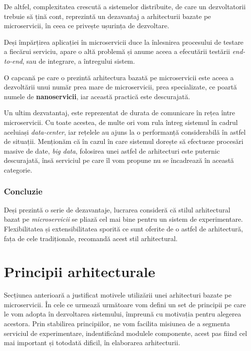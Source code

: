De altfel, complexitatea crescută a sistemelor distribuite, de care un dezvoltatorii trebuie să țină cont, reprezintă un dezavantaj a arhitecturii bazate pe microservicii, în ceea ce privește ușurința de dezvoltare. 

Deși împărțirea aplicației în microservicii duce la înlesnirea procesului de testare a fiecărui serviciu, apare o altă problemă și anume aceea a efecutării testării \textit{end-to-end}, sau de integrare, a întregului sistem. 

\begin{remark}
	O capcană pe care o prezintă arhitectura bazată pe microservicii este aceea a dezvoltării unui număr prea mare de microservicii, prea specializate, ce poartă numele de \textbf{nanoservicii}, iar această practică este descurajată.
\end{remark}

Un ultim dezvatantaj, este reprezentat de durata de comunicare în rețea între microservicii. Cu toate acestea, de multe ori vom rula întreg sistemul în cadrul aceluiași \textit{data-center}, iar rețelele au ajuns la o performanță considerabilă în astfel de situații. Menționăm că în cazul în care sistemul dorește să efectueze procesări masive de date, \textit{big data}, folosirea unei astfel de arhitecturi este puternic descurajată, însă serviciul pe care îl vom propune nu se încadrează în această categorie.

\subsubsection{Concluzie}

Deși prezintă o serie de dezavantaje, lucrarea consideră că stilul arhitectural bazat pe \textit{microservicii} se pliază cel mai bine pentru un sistem de experimentare. Flexibilitatea și extensibilitatea sporită ce sunt oferite de o astfel de arhitectură, fața de cele tradiționale, recomandă acest stil arhitectural.

\section{Principii arhitecturale}

Secțiunea anterioară a justificat motivele utilizării unei arhitecturi bazate pe microservicii. În cele ce urmează următoare vom defini un set de principii pe care le vom adopta în dezvoltarea sistemului, împreună cu motivația pentru alegerea acestora. Prin stabilirea principiilor, ne vom facilita misiunea de a segmenta serviciul de experimentare, indentificând modulele componente, acest pas fiind cel mai important și totodată dificil, în elaborarea arhitecturii.

